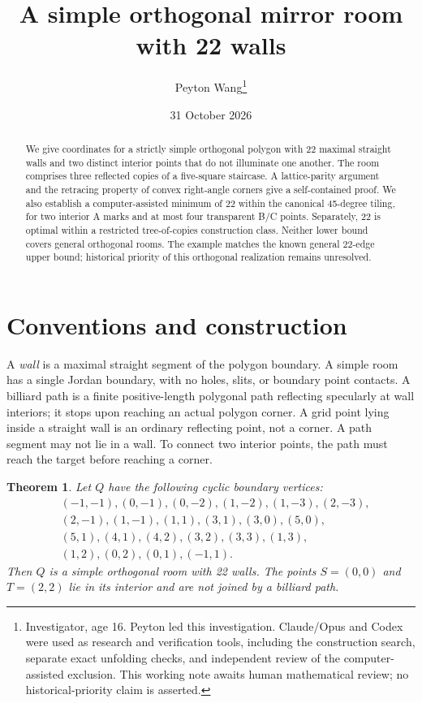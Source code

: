 \documentclass[11pt]{article}
\title{A simple orthogonal mirror room with 22 walls}
\author{Peyton Wang\thanks{Investigator, age 16. Peyton led this investigation. Claude/Opus and Codex were used as research and verification tools, including the construction search, separate exact unfolding checks, and independent review of the computer-assisted exclusion. This working note awaits human mathematical review; no historical-priority claim is asserted.}}
\date{31 October 2026}
\newtheorem{theorem}{Theorem}
\theoremstyle{definition}\newtheorem{definition}[theorem]{Definition}
\begin{document}
\maketitle
\begin{abstract}
We give coordinates for a strictly simple orthogonal polygon with 22 maximal straight walls and two distinct interior points that do not illuminate one another. The room comprises three reflected copies of a five-square staircase. A lattice-parity argument and the retracing property of convex right-angle corners give a self-contained proof. We also establish a computer-assisted minimum of 22 within the canonical 45-degree tiling, for two interior A marks and at most four transparent B/C points. Separately, 22 is optimal within a restricted tree-of-copies construction class. Neither lower bound covers general orthogonal rooms. The example matches the known general 22-edge upper bound; historical priority of this orthogonal realization remains unresolved.
\end{abstract}

\section{Conventions and construction}
A \emph{wall} is a maximal straight segment of the polygon boundary. A simple room has a single Jordan boundary, with no holes, slits, or boundary point contacts. A billiard path is a finite positive-length polygonal path reflecting specularly at wall interiors; it stops upon reaching an actual polygon corner. A grid point lying inside a straight wall is an ordinary reflecting point, not a corner. A path segment may not lie in a wall. To connect two interior points, the path must reach the target before reaching a corner.

\begin{theorem}\label{thm:room}
Let $Q$ have the following cyclic boundary vertices:
\begin{align*}
&(-1,-1),(0,-1),(0,-2),(1,-2),(1,-3),(2,-3),\\
&(2,-1),(1,-1),(1,1),(3,1),(3,0),(5,0),\\
&(5,1),(4,1),(4,2),(3,2),(3,3),(1,3),\\
&(1,2),(0,2),(0,1),(-1,1).
\end{align*}
Then $Q$ is a simple orthogonal room with 22 walls. The points $S=(0,0)$ and $T=(2,2)$ lie in its interior and are not joined by a billiard path.
\end{theorem}
\end{document}
